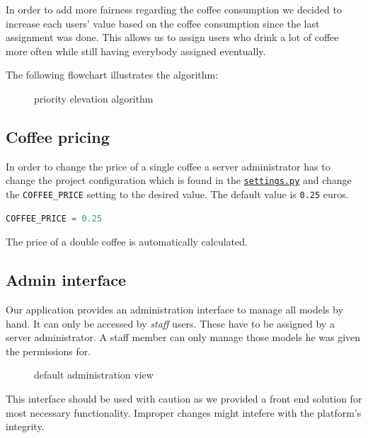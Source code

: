 In order to add more fairness regarding the coffee consumption we
decided to increase each users' value based on the coffee consumption
since the last assignment was done. This allows us to assign users who
drink a lot of coffee more often while still having everybody assigned
eventually.

The following flowchart illustrates the algorithm:

\begin{figure}[htbp]
\centering
{}
\caption{priority elevation algorithm}
\end{figure}

\subsection{Coffee pricing}\label{coffee-pricing}

In order to change the price of a single coffee a server administrator
has to change the project configuration which is found in the
\href{../../server/server/settings.py}{\texttt{settings.py}} and change
the \texttt{COFFEE\_PRICE} setting to the desired value. The default
value is \texttt{0.25} euros.

\begin{lstlisting}[language=python]
COFFEE_PRICE = 0.25
\end{lstlisting}

The price of a double coffee is automatically calculated.

\subsection{Admin interface}\label{admin-interface}

Our application provides an administration interface to manage all
models by hand. It can only be accessed by \emph{staff} users. These
have to be assigned by a server administrator. A staff member can only
manage those models he was given the permissions for.

\begin{figure}[htbp]
\centering
{}
\caption{default administration view}
\end{figure}

This interface should be used with caution as we provided a front end
solution for most necessary functionality. Improper changes might
intefere with the platform's integrity.

